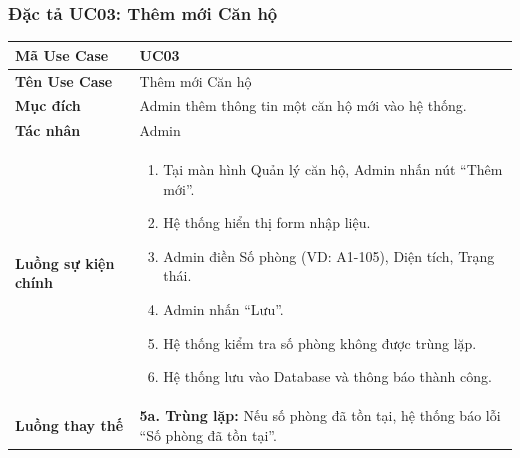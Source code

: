 \documentclass[12pt,a4paper]{article}
\begin{document}
\subsubsection{Đặc tả UC03: Thêm mới Căn hộ}
\begin{table}[H]
    \centering
    \renewcommand{\arraystretch}{1.2}
    \begin{tabularx}{\textwidth}{|l|X|}
    \hline
    \textbf{Mã Use Case} & \textbf{UC03} \\
    \hline
    \textbf{Tên Use Case} & Thêm mới Căn hộ \\
    \hline
    \textbf{Mục đích} & Admin thêm thông tin một căn hộ mới vào hệ thống. \\
    \hline
    \textbf{Tác nhân} & Admin \\
    \hline
    \textbf{Luồng sự kiện chính} &
    \begin{enumerate}
        \item Tại màn hình Quản lý căn hộ, Admin nhấn nút ``Thêm mới''.
        \item Hệ thống hiển thị form nhập liệu.
        \item Admin điền Số phòng (VD: A1-105), Diện tích, Trạng thái.
        \item Admin nhấn ``Lưu''.
        \item Hệ thống kiểm tra số phòng không được trùng lặp.
        \item Hệ thống lưu vào Database và thông báo thành công.
    \end{enumerate} \\
    \hline
    \textbf{Luồng thay thế} & \textbf{5a. Trùng lặp:} Nếu số phòng đã tồn tại, hệ thống báo lỗi ``Số phòng đã tồn tại''. \\
    \hline
    \end{tabularx}
\end{table}

\end{document}
